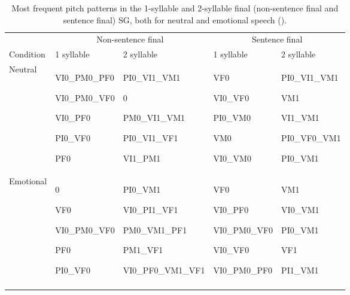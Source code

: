 \documentclass[output=paper]{langsci/langscibook}
\begin{document}
\begin{table}[p]
\footnotesize
\begin{tabularx}{\textwidth}{lXXXX} 
\lsptoprule
& \multicolumn{2}{c}{Non-sentence final} &  \multicolumn{2}{c}{Sentence final} \\\cmidrule(lr){2-3} \cmidrule(lr){4-5}
{Condition} & {1 syllable} & {2 syllable} & {1 syllable} & {2 syllable} \\\midrule
{Neutral} & {VI0\_PM0\_PF0} 

{VI0\_PM0\_VF0} 

{VI0\_PF0} 

{PI0\_VF0} 

PF0 & {PI0\_VI1\_VM1} 

{0} 

{PM0\_VI1\_VM1} 

{PI0\_VI1\_VF1} 

VI1\_PM1 & {VF0} 

{VI0\_VF0} 

{PI0\_VM0} 

{VM0} 

VI0\_VM0 & {PI0\_VI1\_VM1} 

{VM1} 

{VI1\_VM1} 

{PI0\_VF0\_VM1} 

PI0\_VM1 \\
{Emotional} & {0} 

{VF0} 

{VI0\_PM0\_VF0} 

{PF0} 

PI0\_VF0 & {PI0\_VM1} 

{VI0\_PI1\_VF1} 

{PM0\_VM1\_PF1} 

{PM1\_VF1} 

\mbox{VI0\_PF0\_VM1\_VF1} & {VF0} 

{VI0\_PF0} 

{VI0\_PM0\_VF0} 

{VI0\_VF0} 

VI0\_PM0\_PF0 & {VM1} 

{VI0\_VM1} 

{PI0\_VM1} 

{VF1} 

PI1\_VM1 \\
\lspbottomrule
\end{tabularx}


\caption{Most frequent pitch patterns in the 1-syllable and 2-syllable final (non-sentence final and sentence final) SG, both for neutral and emotional speech (\citealt{Laplaza2014}).}
\label{tab:gar:13}
\end{table}
\end{document}
